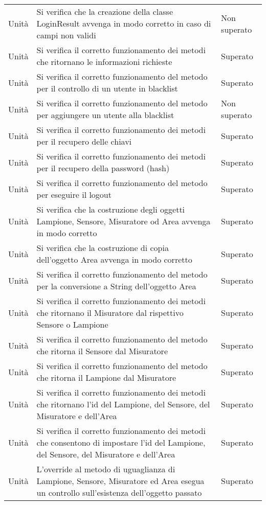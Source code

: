 \begin{center}
\begin{xltabular}{\linewidth}{|l|X|l|}
        Unità & Si verifica che la creazione della classe LoginResult avvenga in modo corretto in caso di campi non validi & Non superato\\
        Unità & Si verifica il corretto funzionamento dei metodi che ritornano le informazioni richieste & Superato\\
        Unità & Si verifica il corretto funzionamento del metodo per il controllo di un utente in blacklist & Superato\\
        Unità & Si verifica il corretto funzionamento del metodo per aggiungere un utente alla blacklist & Non superato\\
        Unità & Si verifica il corretto funzionamento dei metodi per il recupero delle chiavi & Superato\\
        Unità & Si verifica il corretto funzionamento dei metodi per il recupero della password (hash) & Superato\\
        Unità & Si verifica il corretto funzionamento del metodo per eseguire il logout & Superato\\
        Unità & Si verifica che la costruzione degli oggetti Lampione, Sensore, Misuratore od Area avvenga in modo corretto & Superato\\
        Unità & Si verifica che la costruzione di copia dell'oggetto Area avvenga in modo corretto & Superato\\
        Unità & Si verifica il corretto funzionamento del metodo per la conversione a String dell'oggetto Area & Superato\\
        Unità & Si verifica il corretto funzionamento dei metodi che ritornano il Misuratore dal rispettivo Sensore o Lampione & Superato\\
        Unità & Si verifica il corretto funzionamento del metodo che ritorna il Sensore dal Misuratore & Superato\\
        Unità & Si verifica il corretto funzionamento del metodo che ritorna il Lampione dal Misuratore & Superato\\
        Unità & Si verifica il corretto funzionamento dei metodi che ritornano l'id del Lampione, del Sensore, del Misuratore e dell'Area & Superato\\
        Unità & Si verifica il corretto funzionamento dei metodi che consentono di impostare l'id del Lampione, del Sensore, del Misuratore e dell'Area & Superato\\
        Unità & L'override al metodo di uguaglianza di Lampione, Sensore, Misuratore ed Area esegua un controllo sull'esistenza dell'oggetto passato & Superato\\

\end{xltabular}
\end{center}
